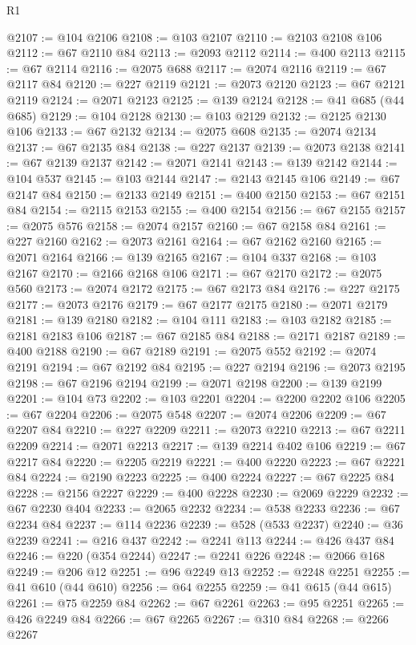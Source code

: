 \begin{lexlean}{R1}
\begin{coremodule}
{{{{{{{{{{{{{{{{{{{{{{{{{{{{{{{{{{{{{{{{@2107 := @104 @2106
@2108 := @103 @2107
@2110 := @2103 @2108 @106
@2112 := @67 @2110 @84
@2113 := @2093 @2112
@2114 := @400 @2113
@2115 := @67 @2114
@2116 := @2075 @688
@2117 := @2074 @2116
@2119 := @67 @2117 @84
@2120 := @227 @2119
@2121 := @2073 @2120
@2123 := @67 @2121 @2119
@2124 := @2071 @2123
@2125 := @139 @2124
@2128 := @41 @685 (@44 @685)
@2129 := @104 @2128
@2130 := @103 @2129
@2132 := @2125 @2130 @106
@2133 := @67 @2132
@2134 := @2075 @608
@2135 := @2074 @2134
@2137 := @67 @2135 @84
@2138 := @227 @2137
@2139 := @2073 @2138
@2141 := @67 @2139 @2137
@2142 := @2071 @2141
@2143 := @139 @2142
@2144 := @104 @537
@2145 := @103 @2144
@2147 := @2143 @2145 @106
@2149 := @67 @2147 @84
@2150 := @2133 @2149
@2151 := @400 @2150
@2153 := @67 @2151 @84
@2154 := @2115 @2153
@2155 := @400 @2154
@2156 := @67 @2155
@2157 := @2075 @576
@2158 := @2074 @2157
@2160 := @67 @2158 @84
@2161 := @227 @2160
@2162 := @2073 @2161
@2164 := @67 @2162 @2160
@2165 := @2071 @2164
@2166 := @139 @2165
@2167 := @104 @337
@2168 := @103 @2167
@2170 := @2166 @2168 @106
@2171 := @67 @2170
@2172 := @2075 @560
@2173 := @2074 @2172
@2175 := @67 @2173 @84
@2176 := @227 @2175
@2177 := @2073 @2176
@2179 := @67 @2177 @2175
@2180 := @2071 @2179
@2181 := @139 @2180
@2182 := @104 @111
@2183 := @103 @2182
@2185 := @2181 @2183 @106
@2187 := @67 @2185 @84
@2188 := @2171 @2187
@2189 := @400 @2188
@2190 := @67 @2189
@2191 := @2075 @552
@2192 := @2074 @2191
@2194 := @67 @2192 @84
@2195 := @227 @2194
@2196 := @2073 @2195
@2198 := @67 @2196 @2194
@2199 := @2071 @2198
@2200 := @139 @2199
@2201 := @104 @73
@2202 := @103 @2201
@2204 := @2200 @2202 @106
@2205 := @67 @2204
@2206 := @2075 @548
@2207 := @2074 @2206
@2209 := @67 @2207 @84
@2210 := @227 @2209
@2211 := @2073 @2210
@2213 := @67 @2211 @2209
@2214 := @2071 @2213
@2217 := @139 @2214 @402 @106
@2219 := @67 @2217 @84
@2220 := @2205 @2219
@2221 := @400 @2220
@2223 := @67 @2221 @84
@2224 := @2190 @2223
@2225 := @400 @2224
@2227 := @67 @2225 @84
@2228 := @2156 @2227
@2229 := @400 @2228
@2230 := @2069 @2229
@2232 := @67 @2230 @404
@2233 := @2065 @2232
@2234 := @538 @2233
@2236 := @67 @2234 @84
@2237 := @114 @2236
@2239 := @528 (@533 @2237)
@2240 := @36 @2239
@2241 := @216 @437
@2242 := @2241 @113
@2244 := @426 @437 @84
@2246 := @220 (@354 @2244)
@2247 := @2241 @226
@2248 := @2066 @168
@2249 := @206 @12
@2251 := @96 @2249 @13
@2252 := @2248 @2251
@2255 := @41 @610 (@44 @610)
@2256 := @64 @2255
@2259 := @41 @615 (@44 @615)
@2261 := @75 @2259 @84
@2262 := @67 @2261
@2263 := @95 @2251
@2265 := @426 @2249 @84
@2266 := @67 @2265
@2267 := @310 @84
@2268 := @2266 @2267
}}}}}}}}}}}}}}}}}}}}}}}}}}}}}}}}}}}}}}}}
\end{coremodule}
\end{lexlean}
